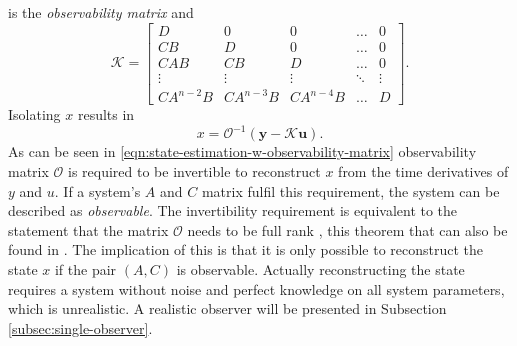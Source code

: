 is the \textit{observability matrix} and
\[ \mathcal{K}=
\begin{bmatrix}
    D & 0 & 0 & \hdots & 0\\
    CB & D & 0 & \hdots & 0\\
    CAB & CB & D & \hdots & 0 \\
    \vdots & \vdots & \vdots & \ddots & \vdots \\
    CA^{n-2}B & CA^{n-3}B & CA^{n-4}B & \hdots & D
\end{bmatrix}.
\]
Isolating $x$ results in
\begin{equation}\label{eqn:state-estimation-w-observability-matrix}
    x = \mathcal{O}^{-1}(\mathbf{y}-\mathcal{K}\mathbf{u}).
\end{equation}
As can be seen in \eqref{eqn:state-estimation-w-observability-matrix} observability matrix $\mathcal{O}$ is required to be invertible to reconstruct $x$ from the time derivatives of $y$ and $u$. If a system's $A$ and $C$ matrix fulfil this requirement, the system can be described as \textit{observable}. The invertibility requirement is equivalent to the statement that the matrix $\mathcal{O}$ needs to be full rank \cite[Section 2.9]{Lay2016LinearApplications}, this theorem that can also be found in \cite[Corollary 3.8]{Antsaklis2006LinearSystems}. The implication of this is that it is only possible to reconstruct the state $x$ if the pair $(A,C)$ is observable. Actually reconstructing the state requires a system without noise and perfect knowledge on all system parameters, which is unrealistic. A realistic observer will be presented in Subsection \ref{subsec:single-observer}.

